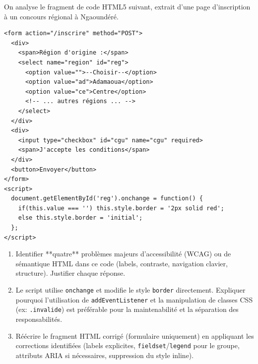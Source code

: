 \documentclass[11pt]{article}
\begin{document}
\begin{exercice}
On analyse le fragment de code HTML5 suivant, extrait d'une page d'inscription à un concours régional à Ngaoundéré.
\begin{verbatim}
<form action="/inscrire" method="POST">
  <div>
    <span>Région d'origine :</span>
    <select name="region" id="reg">
      <option value="">--Choisir--</option>
      <option value="ad">Adamaoua</option>
      <option value="ce">Centre</option>
      <!-- ... autres régions ... -->
    </select>
  </div>
  <div>
    <input type="checkbox" id="cgu" name="cgu" required>
    <span>J'accepte les conditions</span>
  </div>
  <button>Envoyer</button>
</form>
<script>
  document.getElementById('reg').onchange = function() {
    if(this.value === '') this.style.border = '2px solid red';
    else this.style.border = 'initial';
  };
</script>
\end{verbatim}
\begin{enumerate}
    \item Identifier **quatre** problèmes majeurs d'accessibilité (WCAG) ou de sémantique HTML dans ce code (labels, contraste, navigation clavier, structure). Justifier chaque réponse.
    \item Le script utilise \texttt{onchange} et modifie le style \texttt{border} directement. Expliquer pourquoi l'utilisation de \texttt{addEventListener} et la manipulation de classes CSS (ex: \texttt{.invalide}) est préférable pour la maintenabilité et la séparation des responsabilités.
    \item Réécrire le fragment HTML corrigé (formulaire uniquement) en appliquant les corrections identifiées (labels explicites, \texttt{fieldset}/\texttt{legend} pour le groupe, attributs ARIA si nécessaires, suppression du style inline).
\end{enumerate}
\end{exercice}
\end{document}

